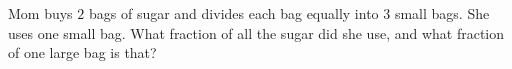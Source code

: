 Mom buys $2$ bags of sugar and divides each bag equally into $3$ small bags. She uses one small bag. What fraction of all the sugar did she use, and what fraction of one large bag is that?
